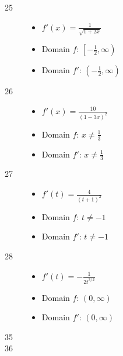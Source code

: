 \documentclass[letterpaper]{exam}
\begin{document}
\begin{description}
      \item[25]
        \begin{itemize}
          \item $f'(x) = \frac{1}{\sqrt{1 + 2x}}$
          \item Domain $f$: $\left[ - \frac{1}{2}, \infty \right)$
          \item Domain $f'$: $\left( - \frac{1}{2}, \infty \right)$
        \end{itemize}

      \item[26]
        \begin{itemize}
          \item $f'(x) = \frac{10}{(1 - 3x)^2}$
          \item Domain $f$: $x \neq \frac{1}{3}$
          \item Domain $f'$: $x \neq \frac{1}{3}$
        \end{itemize}

      \item[27]
        \begin{itemize}
          \item $f'(t) = \frac{4}{(t + 1)^2}$
          \item Domain $f$: $t \neq -1$
          \item Domain $f'$: $t \neq -1$
        \end{itemize}

      \item[28]
        \begin{itemize}
          \item $f'(t) = -\frac{ 1 }{ 2t^{3/2} }$
          \item Domain $f$: $(0, \infty)$
          \item Domain $f'$: $(0, \infty)$
        \end{itemize}

      \item[35] 

      \item[36] 


\end{description}
\end{document}
